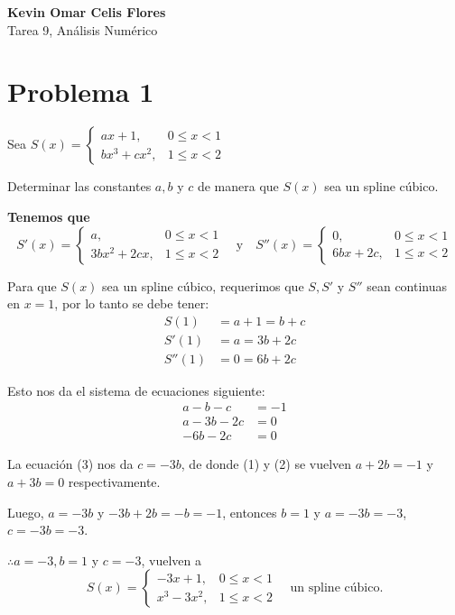 \documentclass[a4paper,12pt]{article}
\begin{document}
\begin{flushleft}
    \textbf{Kevin Omar Celis Flores} \\
    Tarea 9, Análisis Numérico
\end{flushleft}

\section*{Problema 1}

Sea $S(x) = \begin{cases} ax + 1, & 0 \le x < 1 \\ bx^3 + cx^2, & 1 \le x < 2 \end{cases}$

Determinar las constantes $a, b$ y $c$ de manera que $S(x)$ sea un spline cúbico.

\textbf{Tenemos que}
\[ S'(x) = \begin{cases} a, & 0 \le x < 1 \\ 3bx^2 + 2cx, & 1 \le x < 2 \end{cases} \quad \text{y} \quad S''(x) = \begin{cases} 0, & 0 \le x < 1 \\ 6bx + 2c, & 1 \le x < 2 \end{cases} \]

Para que $S(x)$ sea un spline cúbico, requerimos que $S, S'$ y $S''$ sean continuas en $x=1$, por lo tanto se debe tener:
\begin{align*}
    S(1) &= a + 1 = b + c \\
    S'(1) &= a = 3b + 2c \\
    S''(1) &= 0 = 6b + 2c
\end{align*}

Esto nos da el sistema de ecuaciones siguiente:
\begin{align}
    a - b - c &= -1 \\
    a - 3b - 2c &= 0 \\
    -6b - 2c &= 0
\end{align}

La ecuación (3) nos da $c = -3b$, de donde (1) y (2) se vuelven $a + 2b = -1$ y $a + 3b = 0$ respectivamente.

Luego, $a = -3b$ y $-3b + 2b = -b = -1$, entonces $b = 1$ y $a = -3b = -3$, $c = -3b = -3$.

$\therefore a = -3, b = 1$ y $c = -3$, vuelven a
\[ S(x) = \begin{cases} -3x + 1, & 0 \le x < 1 \\ x^3 - 3x^2, & 1 \le x < 2 \end{cases} \quad \text{un spline cúbico.} \]
\end{document}
